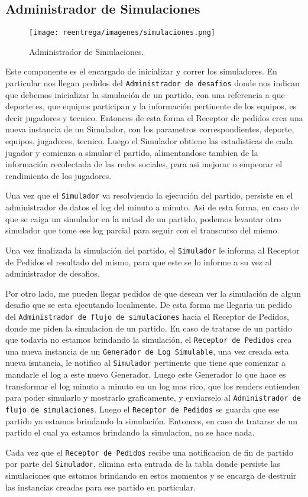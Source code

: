 \subsection{Administrador de Simulaciones}

\begin{figure}[H]
   \centering
   \texttt{[image: reentrega/imagenes/simulaciones.png]}
   \caption{Administrador de Simulaciones.}
\end{figure}

Este componente es el encargado de inicializar y correr los simuladores. En particular nos llegan pedidos del \texttt{Administrador de desafios} donde nos indican que debemos inicializar la simulación de un partido, con una referencia a que deporte es, que equipos participan y la información pertinente de los equipos, es decir jugadores y tecnico. Entonces de esta forma el Receptor de pedidos crea una nueva instancia de un Simulador, con los parametros correspondientes, deporte, equipos, jugadores, tecnico. Luego el Simulador obtiene las estadisticas de cada jugador y comienza a simular el partido, alimentandose tambien de la información recolectada de las redes sociales, para asi mejorar o empeorar el rendimiento de los jugadores.

Una vez que el \texttt{Simulador} va resolviendo la ejecución del partido, persiste en el administrador de datos el log del minuto a minuto. Asi de esta forma, en caso de que se caiga un simulador en la mitad de un partido, podemos levantar otro simulador que tome ese log parcial para seguir con el transcurso del mismo.

Una vez finalizada la simulación del partido, el \texttt{Simulador} le informa al Receptor de Pedidos el resultado del mismo, para que este se lo informe a su vez al administrador de desafios.

Por otro lado, me pueden llegar pedidos de que desean ver la simulación de algun desafio que se esta ejecutando localmente. De esta forma me llegaria un pedido del \texttt{Administrador de flujo de simulaciones} hacia el Receptor de Pedidos, donde me piden la simulacion de un partido. En caso de tratarse de un partido que todavia no estamos brindando la simulación, el \texttt{Receptor de Pedidos} crea una nueva instancia de un \texttt{Generador de Log Simulable}, una vez creada esta nueva isntancia, le notifico al \texttt{Simulador} pertinente que tiene que comenzar a mandarle el log a este nuevo Generador. Luego este Generador lo que hace es transformar el log minuto a minuto en un log mas rico, que los renders entienden para poder simularlo y mostrarlo graficamente, y enviarselo al \texttt{Administrador de flujo de simulaciones}. Luego el \texttt{Receptor de Pedidos} se guarda que ese partido ya  estamos brindando la simulación. Entonces, en caso de tratarse de un partido el cual ya estamos brindando la simulacion, no se hace nada.

Cada vez que el \texttt{Receptor de Pedidos} recibe una notificacion de fin de partido por parte del \texttt{Simulador}, elimina esta entrada de la tabla donde persiste las simulaciones que estamos brindando en estos momentos y se encarga de destruir las instancias creadas para ese partido en particular.

